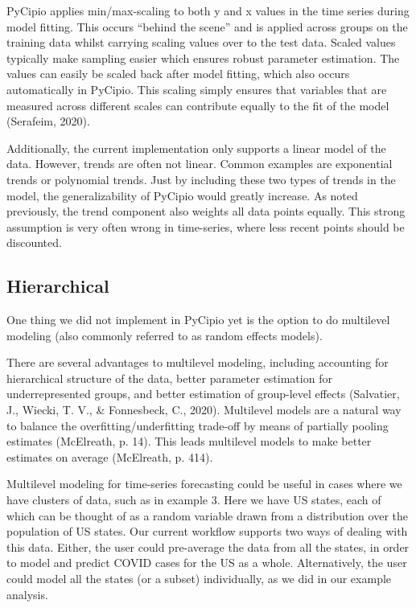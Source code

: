 \documentclass{article}
\begin{document}
PyCipio applies min/max-scaling to both y and x values in the time series during model fitting. This occurs “behind the scene” and is applied across groups on the training data whilst carrying scaling values over to the test data. Scaled values typically make sampling easier which ensures robust parameter estimation. The values can easily be scaled back after model fitting, which also occurs automatically in PyCipio. This scaling simply ensures that variables that are measured across different scales can contribute equally to the fit of the model (Serafeim, 2020). 

Additionally, the current implementation only supports a linear model of the data. However, trends are often not linear. Common examples are exponential trends or polynomial trends. Just by including these two types of trends in the model, the generalizability of PyCipio would greatly increase. As noted previously, the trend component also weights all data points equally. This strong assumption is very often wrong in time-series, where less recent points should be discounted. 

\subsection{Hierarchical}

One thing we did not implement in PyCipio yet is the option to do multilevel modeling (also commonly referred to as random effects models).

There are several advantages to multilevel modeling, including accounting for hierarchical structure of the data, better parameter estimation for underrepresented groups, and better estimation of group-level effects (Salvatier, J., Wiecki, T. V., \& Fonnesbeck, C., 2020). Multilevel models are a natural way to balance the overfitting/underfitting trade-off by means of partially pooling estimates (McElreath, p. 14). This leads multilevel models to make better estimates on average (McElreath, p. 414).

Multilevel modeling for time-series forecasting could be useful in cases where we have clusters of data, such as in example 3. Here we have US states, each of which can be thought of as a random variable drawn from a distribution over the population of US states. Our current workflow supports two ways of dealing with this data. Either, the user could pre-average the data from all the states, in order to model and predict COVID cases for the US as a whole. Alternatively, the user could model all the states (or a subset) individually, as we did in our example analysis.
\end{document}
